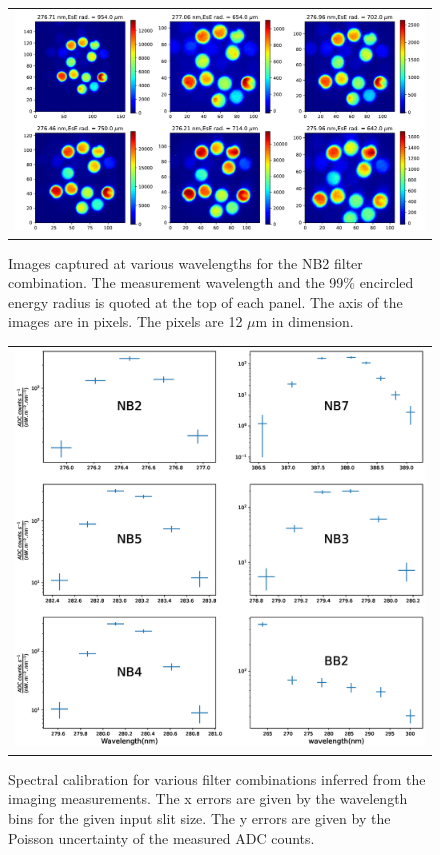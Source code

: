 \documentclass[12pt]{spieman}  %
\begin{document}
\begin{figure}
\begin{center}
\begin{tabular}{c}
\includegraphics[width=0.8\linewidth]{nb2_images.pdf}
\end{tabular}
\end{center}
\caption 
{ \label{fig:nb2_images} Images captured at various wavelengths for the NB2 filter combination. The measurement wavelength and the 99\% encircled energy radius is quoted at the top of each panel. The axis of the images are in pixels. The pixels are 12 $\mu$m in dimension.} 
\end{figure}

\begin{figure}
\begin{center}
\begin{tabular}{c}
\includegraphics[trim={2.4cm 2.7cm 3.5cm 4.2cm},clip,width=\linewidth]{spec_calib.eps}
\end{tabular}
\end{center}
\caption 
{ \label{fig:sepc_calib} Spectral calibration for various filter combinations inferred from the imaging measurements. The x errors are given by the wavelength bins for the given input slit size. The y errors are given by the Poisson uncertainty of the measured ADC counts.} 
\end{figure}
\end{document}
